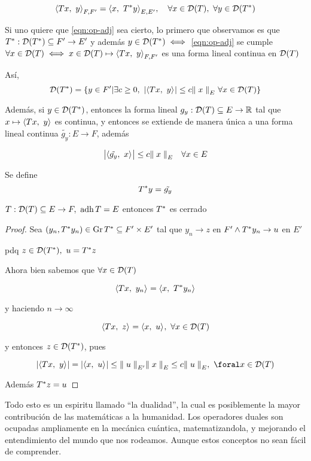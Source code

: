 \begin{equation} \label{eqn:op-adj}
    \prodint[F,F']{Tx}{y} = \prodint[E,E']{x}{T\adj y}, \quad \forall x \in \cd(T),\ \forall y \in \cd(T\adj)
\end{equation}

Si uno quiere que \eqref{eqn:op-adj} sea cierto, lo primero que observamos es que $T\adj : \cd(T\adj) \subseteq F' \to E' $ y además $y \in \cd(T\adj) \iff $ \eqref{eqn:op-adj} se cumple $ \forall x \in \cd(T) \iff x \in \cd(T) \mapsto \prodint[F, F']{Tx}{y} $ es una forma lineal continua en $\cd(T)$

Así, $$ \cd(T\adj) = \{ y  \in F' | \exists c \geq 0 ,\ \abs{ \prodint{Tx}{y} } \leq c \norm[E]{x} \ \forall x \in \cd(T) \} $$

Además, si $y \in \cd(T\adj)$, entonces la forma lineal $g_y : \cd(T) \subseteq E \to \rr $ tal que $ x \mapsto \prodint{Tx}{y} $ es continua, y entonces se extiende de manera única a una forma lineal continua $\tilde{g_y} : E \to F$, además 

$$ \abs{\prodint{ \tilde{g_y} }{x}} \leq c \norm[E]{x} \quad \forall x \in E$$

Se define $$ T\adj y = \tilde{g_y} $$

\begin{prop}
$T: \cd(T) \subseteq E \to F,\ \adh T = E$ entonces $T\adj$ es cerrado
\end{prop}

\begin{proof}
Sea $(y_n, T\adj y_n) \in \gr T\adj \subseteq F' \times E'$ tal que $y_n \to z $ en $F' \wedge T\adj y_n \to u$  en $E'$

pdq $z \in \cd(T\adj) ,\ u = T\adj z $

Ahora bien sabemos que $\forall x \in \cd(T)$

$$ \prodint{Tx}{y_n} = \prodint{x}{T\adj y_n} $$

y haciendo $n \to \infty$

$$ \prodint{Tx}{z} = \prodint{x}{u} ,\ \forall x \in \cd(T) $$

y entonces $z \in \cd(T\adj)$, pues

$$ \abs{ \prodint{Tx}{y} } = \abs{ \prodint{x}{u} } \leq \norm[E']{u} \norm[E]{x} \leq c \norm[E]{u} ,\ \foral x \in \cd(T) $$

Además $T\adj z = u$
\end{proof}

Todo esto es un espiritu llamado ``la dualidad'', la cual es posiblemente la mayor contribución de las matemáticas a la humanidad. Los operadores duales son ocupadas ampliamente en la mecánica cuántica, matematizandola, y mejorando el entendimiento del mundo que nos rodeamos. Aunque estos conceptos no sean fácil de comprender.

